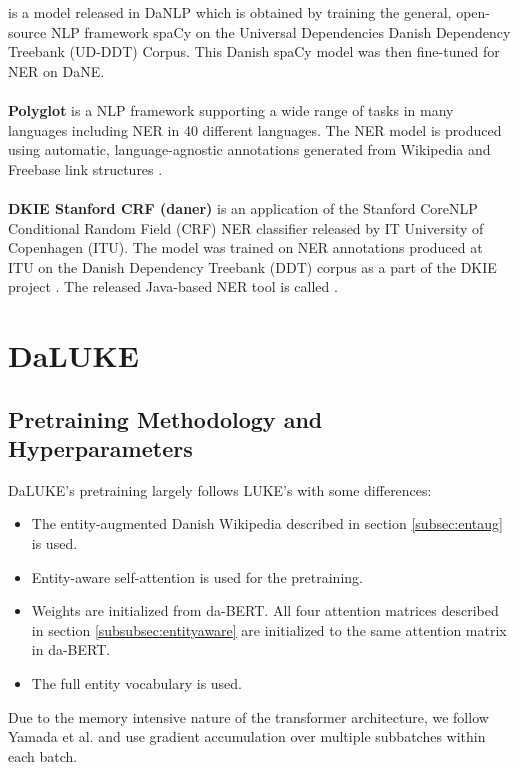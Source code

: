 \documentclass[main.tex]{subfiles}
\begin{document}
is a model released in DaNLP which is obtained by training the general, open-source NLP framework spaCy \cite{honnibal2020spacy} on the Universal Dependencies Danish Dependency Treebank (UD-DDT) Corpus\cite{johann2015udddt}.
This Danish spaCy model was then fine-tuned for NER on DaNE.\\
\\
\textbf{Polyglot}
is a NLP framework supporting a wide range of tasks in many languages including NER in 40 different languages.
The NER model is produced using automatic, language-agnostic annotations generated from Wikipedia and Freebase link structures \cite{rfou2015polyglot}.\\
\\
\textbf{DKIE Stanford CRF (daner)}
is an application of the Stanford CoreNLP Conditional Random Field (CRF) NER classifier \cite{manning2014corenlp} released by IT University of Copenhagen (ITU).
The model was trained on NER annotations produced at ITU on the Danish Dependency Treebank (DDT) corpus \cite{kromann2003ddt} as a part of the DKIE project \cite{derc2014dkie}.
The released Java-based NER tool is called \footnotemark.

\section{DaLUKE}

\subsection{Pretraining Methodology and Hyperparameters}%
\label{sub:dalpre}
DaLUKE's pretraining largely follows LUKE's with some differences:
\begin{itemize}
    \item The entity-augmented Danish Wikipedia described in section \ref{subsec:entaug} is used.
    \item Entity-aware self-attention is used for the pretraining.
    \item Weights are initialized from da-BERT.
    All four attention matrices described in section \ref{subsubsec:entityaware} are initialized to the same attention matrix in da-BERT.
    \item The full entity vocabulary is used.
\end{itemize}
Due to the memory intensive nature of the transformer architecture, we follow Yamada et al. and use gradient accumulation over multiple subbatches within each batch.
\end{document}
